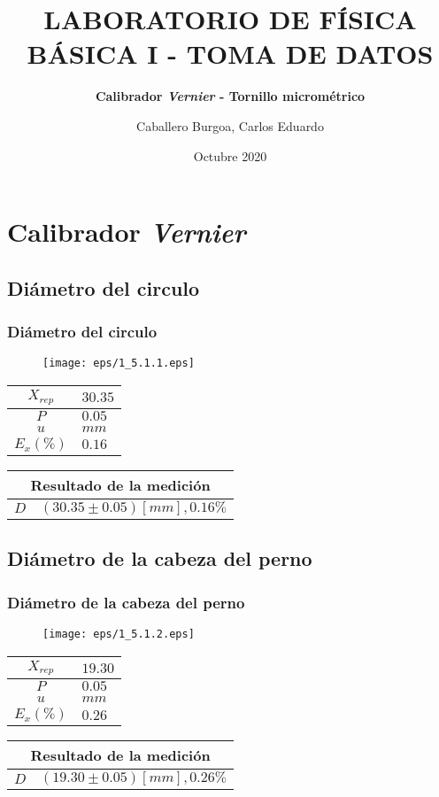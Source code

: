 \documentclass[letter,11pt]{beamer}
\title{\textbf{LABORATORIO DE FÍSICA BÁSICA I - TOMA DE DATOS}}
\subtitle{\textbf{Calibrador \emph{Vernier} - Tornillo micrométrico}}
\author{\small{Caballero Burgoa, Carlos Eduardo}}
\date{\tiny{Octubre 2020}}
\begin{document}
\begin{frame}
\titlepage
\end{frame}

\section{Calibrador \emph{Vernier}}

\subsection{Diámetro del circulo}
\begin{frame}
\frametitle{Diámetro del circulo}
\vspace*{0.8cm}
\begin{figure}
\centering
\texttt{[image: eps/1\_5.1.1.eps]}
\end{figure}
\vspace*{0.4cm}
\scriptsize
\begin{tabular}{|c|>{\centering}m{1.8cm}<{\centering}|}
\hline
$X_{rep}$ &  $30.35$ \tabularnewline \hline
      $P$ &   $0.05$ \tabularnewline \hline
      $u$ &     $mm$ \tabularnewline \hline
$E_x(\%)$ &   $0.16$ \tabularnewline \hline
\end{tabular}
\quad
\begin{tabular}{|c|>{\centering}m{5.7cm}<{\centering}|}
\hline
\multicolumn{2}{|c|}{\textbf{Resultado de la medición}} \\ \hline
$D$ & $( 30.35\pm0.05)[mm], 0.16\%$ \tabularnewline \hline
\end{tabular}
\end{frame}

\subsection{Diámetro de la cabeza del perno}
\begin{frame}
\frametitle{Diámetro de la cabeza del perno}
\vspace*{0.8cm}
\begin{figure}
\centering
\texttt{[image: eps/1\_5.1.2.eps]}
\end{figure}
\vspace*{0.4cm}
\scriptsize
\begin{tabular}{|c|>{\centering}m{1.8cm}<{\centering}|}
\hline
$X_{rep}$ &  $19.30$ \tabularnewline \hline
      $P$ &   $0.05$ \tabularnewline \hline
      $u$ &     $mm$ \tabularnewline \hline
$E_x(\%)$ &   $0.26$ \tabularnewline \hline
\end{tabular}
\quad
\begin{tabular}{|c|>{\centering}m{5.7cm}<{\centering}|}
\hline
\multicolumn{2}{|c|}{\textbf{Resultado de la medición}} \\ \hline
$D$ & $( 19.30\pm0.05)[mm], 0.26\%$ \tabularnewline \hline
\end{tabular}
\end{frame}
\end{document}
